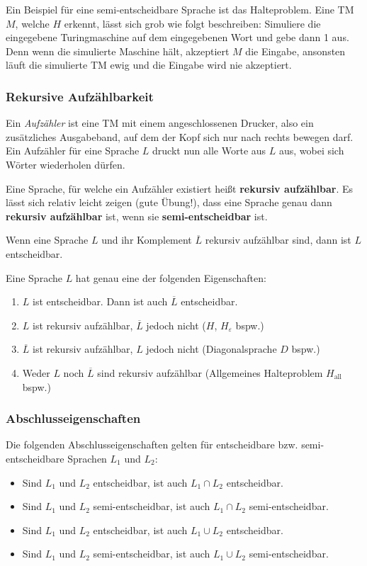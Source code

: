\documentclass[a4paper,parskip=half*,DIV=7,fontsize=11pt]{scrartcl}
\newcommand\comp[1]{\overline#1}
\begin{document}
Ein Beispiel für eine semi-entscheidbare Sprache ist das Halteproblem. Eine TM $M$, welche $H$ erkennt, lässt sich grob wie folgt beschreiben:  Simuliere die eingegebene Turingmaschine auf dem eingegebenen Wort und gebe dann 1 aus. Denn wenn die simulierte Maschine hält, akzeptiert $M$ die Eingabe, ansonsten läuft die simulierte TM ewig und die Eingabe wird nie akzeptiert.

\subsubsection{Rekursive Aufzählbarkeit}
Ein \emph{Aufzähler} ist eine TM mit einem angeschlossenen Drucker, also ein zusätzliches Ausgabeband, auf dem der Kopf sich nur nach rechts bewegen darf.  Ein Aufzähler für eine Sprache $L$ druckt nun alle Worte aus $L$ aus, wobei sich Wörter wiederholen dürfen.

Eine Sprache, für welche ein Aufzähler existiert heißt \textbf{rekursiv aufzählbar}. Es lässt sich relativ leicht zeigen (gute Übung!), dass eine Sprache genau dann \textbf{rekursiv aufzählbar} ist, wenn sie \textbf{semi-entscheidbar} ist.

Wenn eine Sprache $L$ und ihr Komplement $\comp{L}$ rekursiv aufzählbar sind, dann ist $L$ entscheidbar.

Eine Sprache $L$ hat genau eine der folgenden Eigenschaften:

\begin{enumerate}
\item  $L$ ist entscheidbar. Dann ist auch $\comp{L}$ entscheidbar.
\item $L$ ist rekursiv aufzählbar, $\comp{L}$ jedoch nicht ($H$, $H_\varepsilon$ bspw.)
\item $\comp{L}$ ist rekursiv aufzählbar, $L$ jedoch nicht (Diagonalsprache $D$ bspw.)
\item Weder $L$ noch $\comp{L}$ sind rekursiv aufzählbar (Allgemeines Halteproblem $H_\text{all}$ bspw.)
\end{enumerate}

\subsubsection{Abschlusseigenschaften}
Die folgenden Abschlusseigenschaften gelten für entscheidbare bzw. semi-entscheidbare Sprachen $L_1$ und $L_2$:
\begin{itemize}
\item Sind $L_1$ und $L_2$ entscheidbar, ist auch $L_1\cap L_2$ entscheidbar.
\item Sind $L_1$ und $L_2$ semi-entscheidbar, ist auch $L_1\cap L_2$ semi-entscheidbar.
\item Sind $L_1$ und $L_2$ entscheidbar, ist auch $L_1\cup L_2$ entscheidbar.
\item Sind $L_1$ und $L_2$ semi-entscheidbar, ist auch $L_1\cup L_2$ semi-entscheidbar.
\end{itemize}
\end{document}
